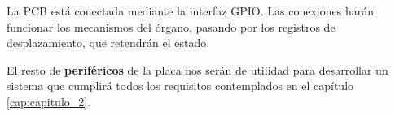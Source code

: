 \smallskip

La \acrshort{PCB} está conectada mediante la interfaz \acrshort{GPIO}. Las conexiones harán funcionar los mecanismos del órgano, pasando por los registros de desplazamiento, que retendrán el estado.

El resto de \textbf{periféricos} de la placa nos serán de utilidad para desarrollar un sistema que cumplirá todos los requisitos contemplados en el capítulo \ref{cap:capitulo_2}.

\newpage
\clearpage{\pagestyle{empty}\cleardoublepage}
